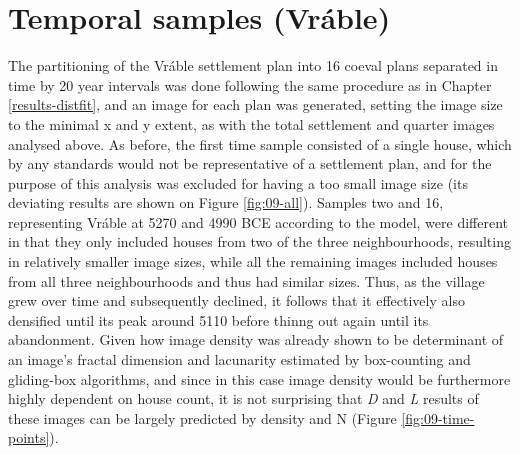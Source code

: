 \documentclass[
  12pt,
  a4paper, twoside]{book}
\begin{document}
\hypertarget{temporal-samples-vruxe1ble-1}{%
\section{Temporal samples (Vráble)}\label{temporal-samples-vruxe1ble-1}}

The partitioning of the Vráble settlement plan into 16 coeval plans separated in time by 20 year intervals was done following the same procedure as in Chapter \ref{results-distfit}, and an image for each plan was generated, setting the image size to the minimal x and y extent, as with the total settlement and quarter images analysed above. As before, the first time sample consisted of a single house, which by any standards would not be representative of a settlement plan, and for the purpose of this analysis was excluded for having a too small image size (its deviating results are shown on Figure \ref{fig:09-all}). Samples two and 16, representing Vráble at 5270 and 4990 BCE according to the model, were different in that they only included houses from two of the three neighbourhoods, resulting in relatively smaller image sizes, while all the remaining images included houses from all three neighbourhoods and thus had similar sizes. Thus, as the village grew over time and subsequently declined, it follows that it effectively also densified until its peak around 5110 before thinng out again until its abandonment. Given how image density was already shown to be determinant of an image's fractal dimension and lacunarity estimated by box-counting and gliding-box algorithms, and since in this case image density would be furthermore highly dependent on house count, it is not surprising that \emph{D} and \emph{L} results of these images can be largely predicted by density and N (Figure \ref{fig:09-time-points}).
\end{document}
